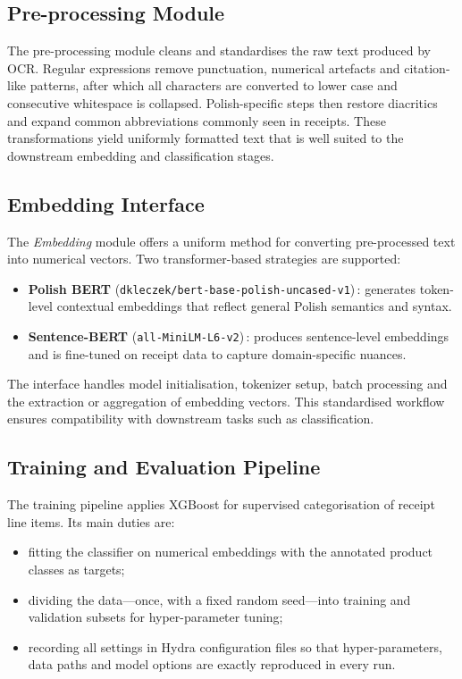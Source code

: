 \documentclass{SGGW-thesis-EN}
\begin{document}
\subsection{Pre-processing Module}
The pre-processing module cleans and standardises the raw text produced by OCR. Regular expressions remove punctuation,
numerical artefacts and citation-like patterns, after which all characters are converted to lower case and consecutive
whitespace is collapsed. Polish-specific steps then restore diacritics and expand common abbreviations commonly seen in
receipts. These transformations yield uniformly formatted text that is well suited to the downstream embedding and
classification stages.


\subsection{Embedding Interface}
The \textit{Embedding} module offers a uniform method for converting pre-processed text into numerical
vectors. Two transformer-based strategies are supported:

\begin{itemize}
  \item \textbf{Polish BERT} (\texttt{dkleczek/bert-base-polish-uncased-v1})\,: generates token-level contextual embeddings
        that reflect general Polish semantics and syntax.
  \item \textbf{Sentence-BERT} (\texttt{all-MiniLM-L6-v2})\,: produces sentence-level embeddings and is fine-tuned on
        receipt data to capture domain-specific nuances.
\end{itemize}

The interface handles model initialisation, tokenizer setup, batch processing and the extraction or aggregation of
embedding vectors. This standardised workflow ensures compatibility with downstream tasks such as classification.


\subsection{Training and Evaluation Pipeline}
The training pipeline applies XGBoost for supervised categorisation of receipt line items. Its main duties are:
\begin{itemize}
  \item fitting the classifier on numerical embeddings with the annotated product classes as targets;
  \item dividing the data—once, with a fixed random seed—into training and validation subsets for hyper-parameter
        tuning;
  \item recording all settings in Hydra configuration files so that hyper-parameters, data paths and model options are
        exactly reproduced in every run.
\end{itemize}
\end{document}
